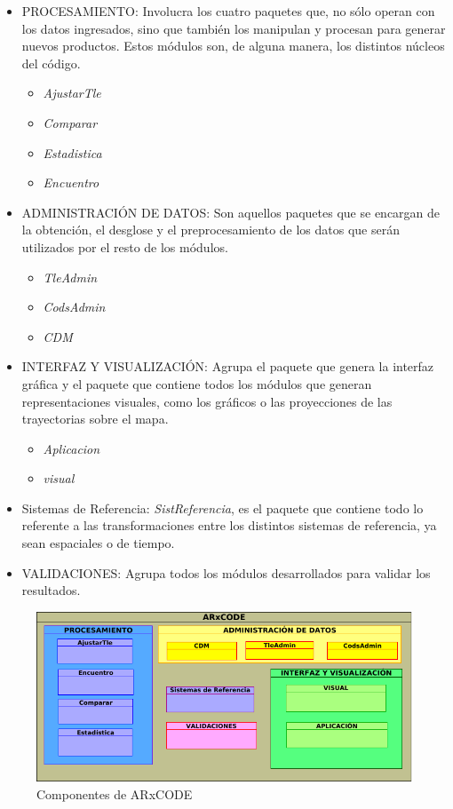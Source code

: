 \begin{itemize}
 \item PROCESAMIENTO: Involucra los cuatro paquetes que, no s\'olo operan con los datos ingresados, sino que tambi\'en los manipulan y procesan para generar nuevos productos. Estos m\'odulos son, de alguna manera, los distintos n\'ucleos del c\'odigo.\\

 \begin{itemize}
 \itemsep0em
  \item {\it{AjustarTle}}
  \item {\it{Comparar}}
  \item {\it{Estadistica}}
  \item {\it{Encuentro}}
 \end{itemize}

 \item ADMINISTRACI\'ON DE DATOS: Son aquellos paquetes que se encargan de la obtenci\'on, el desglose y el preprocesamiento de los datos que ser\'an utilizados por el resto de los m\'odulos.

 \begin{itemize}
 \itemsep0em
  \item {\it{TleAdmin}}
  \item {\it{CodsAdmin}}
  \item {\it{CDM}}
 \end{itemize}

 \item INTERFAZ Y VISUALIZACI\'ON: Agrupa el paquete que genera la interfaz gr\'afica y el paquete que contiene todos los m\'odulos que generan representaciones visuales, como los gr\'aficos o las proyecciones de las trayectorias sobre el mapa.\\
 \begin{itemize}
 \itemsep0em
 \item {\it{Aplicacion}}
 \item {\it{visual}}
 \end{itemize}
 \item Sistemas de Referencia: {\it{SistReferencia}}, es el paquete que contiene todo lo referente a las transformaciones entre los distintos sistemas de referencia, ya sean espaciales o de tiempo.
 \item VALIDACIONES: Agrupa todos los m\'odulos desarrollados para validar los resultados.
\end{itemize}


\begin{figure}[h!]
  \centering
  \includegraphics[width=.8\textwidth]{imagenes/componentesAR}  
  \caption{Componentes de ARxCODE}
  \label{fig:componentes}
\end{figure}

